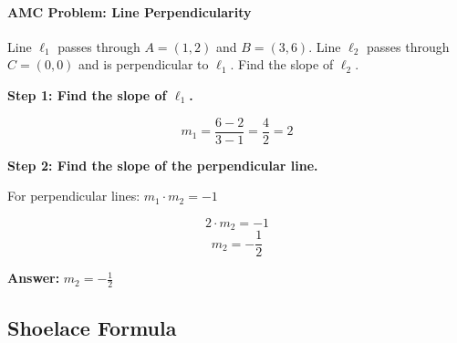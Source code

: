 ﻿\documentclass[12pt]{extarticle}
\begin{document}
\paragraph{AMC Problem: Line Perpendicularity}

Line $\ell_1$ passes through $A = (1, 2)$ and $B = (3, 6)$. Line $\ell_2$ passes through $C = (0, 0)$ and is perpendicular to $\ell_1$. Find the slope of $\ell_2$.

\begin{solutionbox}
\textbf{Step 1: Find the slope of $\ell_1$.}

\[m_1 = \frac{6 - 2}{3 - 1} = \frac{4}{2} = 2\]

\textbf{Step 2: Find the slope of the perpendicular line.}

For perpendicular lines: $m_1 \cdot m_2 = -1$

\[2 \cdot m_2 = -1\]
\[m_2 = -\frac{1}{2}\]

\textbf{Answer:} $\boxed{m_2 = -\frac{1}{2}}$
\end{solutionbox}

\subsection{Shoelace Formula}
\end{document}
